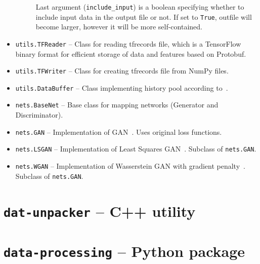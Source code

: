 \begin{itemize}
\begin{description}
Last argument (\texttt{include\_input}) is a boolean specifying whether to include input data in the output file or not. If set to \texttt{True}, outfile will become larger, however it will be more self-contained.
\end{description}
\item \texttt{utils.TFReader} -- Class for reading tfrecords file, which is a TensorFlow binary format for efficient storage of data and features based on Protobuf.
\begin{description}
\end{description}
\item \texttt{utils.TFWriter} -- Class for creating tfrecords file from NumPy files.
\begin{description}
\end{description}
\item \texttt{utils.DataBuffer} -- Class implementing history pool according to~\cite{historypool}.
\begin{description}
\end{description}
\item \texttt{nets.BaseNet} -- Base class for mapping networks (Generator and Discriminator).
\begin{description}
\end{description}
\item \texttt{nets.GAN} -- Implementation of GAN~\cite{origgan}. Uses original loss functions.
\begin{description}
\end{description}
\item \texttt{nets.LSGAN} -- Implementation of Least Squares GAN~\cite{lsgan}. Subclass of \texttt{nets.GAN}.
\begin{description}
\end{description}
\item \texttt{nets.WGAN} -- Implementation of Wasserstein GAN with gradient penalty~\cite{wgan}. Subclass of \texttt{nets.GAN}.
\begin{description}
\end{description}
\end{itemize}

\section[\texttt{dat-unpacker}]{\texttt{dat-unpacker} -- C++ utility}

\section[\texttt{data-processing}]{\texttt{data-processing} -- Python package}
